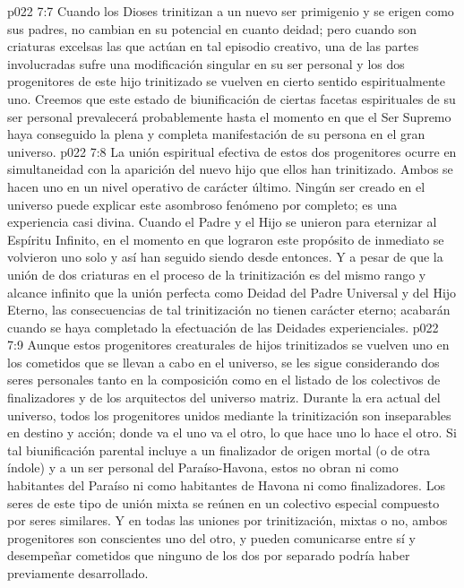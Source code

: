 \vs p022 7:7 \pc Cuando los Dioses trinitizan a un nuevo ser primigenio y se erigen como sus padres, no cambian en su potencial en cuanto deidad; pero cuando son criaturas excelsas las que actúan en tal episodio creativo, una de las partes involucradas sufre una modificación singular en su ser personal y los dos progenitores de este hijo trinitizado se vuelven en cierto sentido espiritualmente uno. Creemos que este estado de biunificación de ciertas facetas espirituales de su ser personal prevalecerá probablemente hasta el momento en que el Ser Supremo haya conseguido la plena y completa manifestación de su persona en el gran universo.
\vs p022 7:8 La unión espiritual efectiva de estos dos progenitores ocurre en simultaneidad con la aparición del nuevo hijo que ellos han trinitizado. Ambos se hacen uno en un nivel operativo de carácter último. Ningún ser creado en el universo puede explicar este asombroso fenómeno por completo; es una experiencia casi divina. Cuando el Padre y el Hijo se unieron para eternizar al Espíritu Infinito, en el momento en que lograron este propósito de inmediato se volvieron uno solo y así han seguido siendo desde entonces. Y a pesar de que la unión de dos criaturas en el proceso de la trinitización es del mismo rango y alcance infinito que la unión perfecta como Deidad del Padre Universal y del Hijo Eterno, las consecuencias de tal trinitización no tienen carácter eterno; acabarán cuando se haya completado la efectuación de las Deidades experienciales.
\vs p022 7:9 Aunque estos progenitores creaturales de hijos trinitizados se vuelven uno en los cometidos que se llevan a cabo en el universo, se les sigue considerando dos seres personales tanto en la composición como en el listado de los colectivos de finalizadores y de los arquitectos del universo matriz. Durante la era actual del universo, todos los progenitores unidos mediante la trinitización son inseparables en destino y acción; donde va el uno va el otro, lo que hace uno lo hace el otro. Si tal biunificación parental incluye a un finalizador de origen mortal (o de otra índole) y a un ser personal del Paraíso\hyp{}Havona, estos no obran ni como habitantes del Paraíso ni como habitantes de Havona ni como finalizadores. Los seres de este tipo de unión mixta se reúnen en un colectivo especial compuesto por seres similares. Y en todas las uniones por trinitización, mixtas o no, ambos progenitores son conscientes uno del otro, y pueden comunicarse entre sí y desempeñar cometidos que ninguno de los dos por separado podría haber previamente desarrollado.
